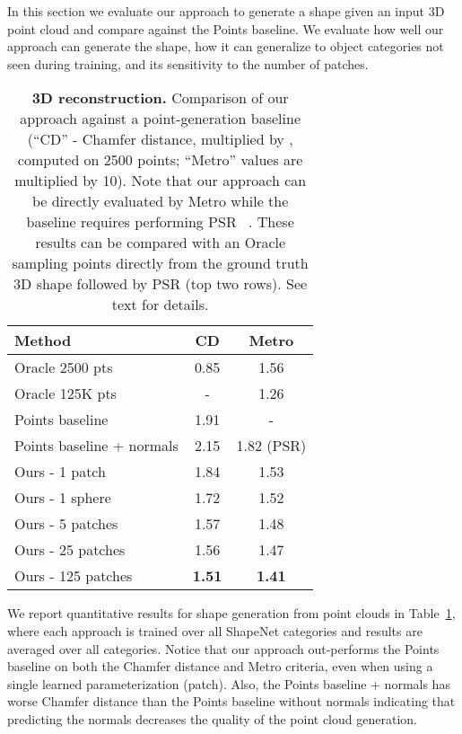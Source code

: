 \documentclass[10pt,twocolumn,letterpaper]{article}
\newcommand{\myparagraph}[1]{\vspace{3pt}\noindent{\bf #1}}
\begin{document}
In this section we evaluate our approach to generate a shape given an input 3D point cloud and compare against the Points baseline.
We evaluate how well our approach can generate the shape, how it can generalize to object categories not seen during training, and its sensitivity to the number of patches.









\begin{table}[t!]
\centering
{
  \begin{tabular}{l|c|c}
  \hline
  Method & CD & Metro    \\


  \hline
  \hline
Oracle 2500 pts & 0.85 & 1.56 \\
 Oracle 125K pts & - & 1.26 \\
\hline
 Points baseline & {1.91}  & -  \\
 Points baseline + normals & {2.15} & {1.82} (PSR)   \\

 Ours - 1 patch & {1.84} &  {1.53}  \\
 Ours - 1 sphere & {1.72}  & {1.52}  \\
 Ours - 5 patches & {1.57} &  {1.48}  \\
 Ours - 25 patches & {1.56} & {1.47}  \\
 Ours - 125 patches & \textbf{1.51} &  \textbf{1.41}  \\

  \end{tabular}
  }
      \caption{{\bf 3D reconstruction.}
      Comparison of our approach against a point-generation baseline (``CD'' - Chamfer distance, multiplied by , computed on 2500 points; ``Metro'' values are multiplied by 10). Note that our approach can be directly evaluated by Metro while the baseline requires performing PSR ~\cite{kazhdan2013screened}. These results can be compared with an Oracle sampling points directly from the ground truth 3D shape followed by PSR (top two rows). See text for details.
}\label{tab:compare_category}
        \vspace{-3mm}

\end{table}


\myparagraph{Evaluation on surface generation.}
We report quantitative results for shape generation from point clouds in Table~\ref{tab:compare_category}, where each approach is trained over all ShapeNet categories and results are averaged over all categories. 
Notice that our approach out-performs the Points baseline on both the Chamfer distance and Metro criteria, even when using a single learned parameterization (patch). Also, the Points baseline + normals has worse Chamfer distance than the Points baseline without normals indicating that predicting the normals decreases the quality of the point cloud generation. 
\end{document}

